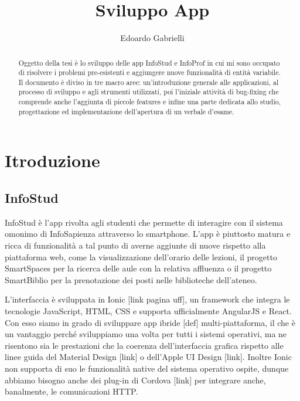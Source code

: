 \documentclass[Lau, oneside]{sapthesis}%
\title{Sviluppo App}
\author{Edoardo Gabrielli}
\begin{document}
\frontmatter
\maketitle

\begin{abstract}
Oggetto della tesi è lo sviluppo delle app InfoStud e InfoProf in cui mi sono occupato di risolvere i problemi pre-esistenti e aggiungere nuove funzionalità di entità variabile.
Il documento è diviso in tre macro aree: un'introduzione generale alle applicazioni, al processo di sviluppo e agli strumenti utilizzati, poi l'iniziale attività di bug-fixing che comprende anche l'aggiunta di piccole features e infine una parte dedicata allo studio, progettazione ed implementazione dell'apertura di un verbale d'esame.
\end{abstract}

\tableofcontents

\mainmatter
\chapter{Itroduzione}
\section{InfoStud}
InfoStud è l'app rivolta agli studenti che permette di interagire con il sistema omonimo di InfoSapienza attraverso lo smartphone. L'app è piuttosto matura e ricca di funzionalità a tal punto di averne aggiunte di nuove rispetto alla piattaforma web, come la visualizzazione dell'orario delle lezioni, il progetto SmartSpaces per la ricerca delle aule con la relativa affluenza o il progetto SmartBiblio per la prenotazione dei posti nelle biblioteche dell'ateneo.

L'interfaccia è sviluppata in Ionic [link pagina uff], un framework che integra le tecnologie JavaScript, HTML, CSS e supporta ufficialmente AngularJS e React. Con esso siamo in grado di sviluppare app ibride [def] multi-piattaforma, il che è un vantaggio perché sviluppiamo una volta per tutti i sistemi operativi, ma ne risentono sia le prestazioni che la coerenza dell'interfaccia grafica rispetto alle linee guida del Material Design [link] o dell'Apple UI Design [link]. Inoltre Ionic non supporta di suo le funzionalità native del sistema operativo ospite, dunque abbiamo bisogno anche dei plug-in di Cordova [link] per integrare anche, banalmente, le comunicazioni HTTP.
\end{document}
